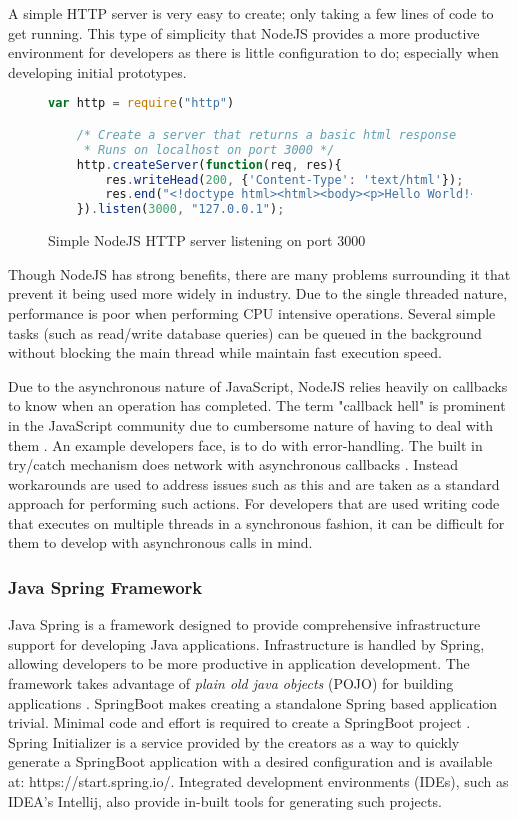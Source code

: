 A simple HTTP server is very easy to create; only taking a few lines of code to get running. 
This type of simplicity that NodeJS provides a more productive environment for developers as there is little configuration to do;
especially when developing initial prototypes.

\begin{figure}[htb]
    \begin{lstlisting}[language=JavaScript, numbers=none]
    var http = require("http")

    /* Create a server that returns a basic html response
     * Runs on localhost on port 3000 */
    http.createServer(function(req, res){
        res.writeHead(200, {'Content-Type': 'text/html'});
        res.end("<!doctype html><html><body><p>Hello World!</p></body></html>");
    }).listen(3000, "127.0.0.1");
    \end{lstlisting}
    \caption{Simple NodeJS HTTP server listening on port 3000}
\end{figure}

Though NodeJS has strong benefits, there are many problems surrounding it that prevent it being used more widely in industry.
Due to the single threaded nature, performance is poor when performing CPU intensive operations.
Several simple tasks (such as read/write database queries) can be queued in the background without blocking the main thread while
maintain fast execution speed. 

Due to the asynchronous nature of JavaScript, NodeJS relies heavily on callbacks to know when an operation has completed.
The term "callback hell" is prominent in the JavaScript community due to cumbersome nature of having to deal with them \cite{altexsoftnodejs}.
An example developers face, is to do with error-handling. The built in try/catch mechanism does network with asynchronous callbacks \cite{gallaba2015don}.
Instead workarounds are used to address issues such as this and are taken as a standard approach for performing such actions.
For developers that are used writing code that executes on multiple threads in a synchronous fashion, it can be difficult for them to
develop with asynchronous calls in mind.

\subsubsection{Java Spring Framework}
Java Spring is a framework designed to provide comprehensive infrastructure support for developing Java applications.
Infrastructure is handled by Spring, allowing developers to be more productive in application development.
The framework takes advantage of \textit{plain old java objects} (POJO) for building applications \cite{johnson2004spring}.
SpringBoot makes creating a standalone Spring based application trivial. Minimal code and effort is required to create a SpringBoot 
project \cite{webb2013spring}.
Spring Initializer is a service provided by the creators as a way to quickly generate a SpringBoot application with a desired
configuration and is available at: https://start.spring.io/.
Integrated development environments (IDEs), such as IDEA's Intellij, also provide in-built tools for generating such projects.

